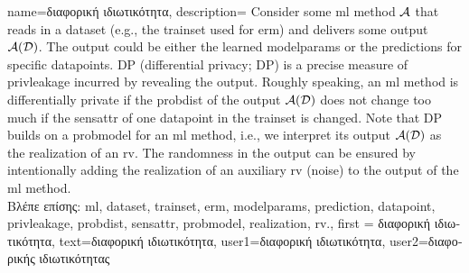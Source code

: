 {name={\foreignlanguage{greek}{διαφορική ιδιωτικότητα}},
  description={
  	Consider some \gls{ml} method $\mathcal{A}$ that reads in a \gls{dataset} (e.g., the \gls{trainset} 
  	used for \gls{erm}) and delivers some output $\mathcal{A}(\mathcal{D})$. The output 
  	could be either the learned \gls{modelparams} or the \gls{prediction}s for specific \gls{datapoint}s. 
  	DP (differential privacy; DP) is a precise measure of \gls{privleakage} incurred by revealing the 
  	output. Roughly speaking, an \gls{ml} method is differentially private if the \gls{probdist} 
  	of the output $\mathcal{A}(\mathcal{D})$ does not change too much if the \gls{sensattr} 
  	of one \gls{datapoint} in the \gls{trainset} is changed. Note that DP 
  	builds on a \gls{probmodel} for an \gls{ml} method, i.e., we interpret its output $\mathcal{A}(\mathcal{D})$ 
  	as the \gls{realization} of an \gls{rv}. The randomness in the output can be ensured 
  	by intentionally adding the \gls{realization} of an auxiliary \gls{rv} (noise) to 
  	the output of the \gls{ml} method.\\
	\foreignlanguage{greek}{Βλέπε επίσης:} \gls{ml}, \gls{dataset}, \gls{trainset}, \gls{erm}, \gls{modelparams}, \gls{prediction}, \gls{datapoint}, \gls{privleakage}, \gls{probdist}, \gls{sensattr}, \gls{probmodel}, \gls{realization}, \gls{rv}.}, 
	first = {\foreignlanguage{greek}{διαφορική ιδιωτικότητα}},
	text={\foreignlanguage{greek}{διαφορική ιδιωτικότητα}},
	user1={\foreignlanguage{greek}{διαφορική ιδιωτικότητα}}, %
   	user2={\foreignlanguage{greek}{διαφορικής ιδιωτικότητας}} %
}

